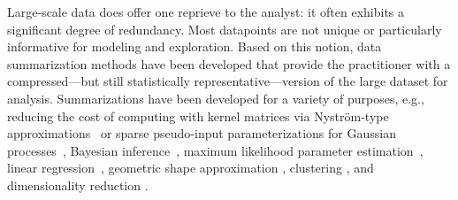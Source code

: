 \documentclass[a4paper,12pt,index,custombib]{Classes/PhDThesisPSnPDF}
\begin{document}
\begingroup
Large-scale data does offer one reprieve to the analyst: it often exhibits a significant degree of redundancy. Most datapoints are 
not unique or particularly informative for modeling and exploration. Based on this notion, data summarization methods have been developed  
that provide the practitioner with a compressed---but still statistically representative---version of the large dataset for analysis.
Summarizations have been developed for a variety of purposes, e.g., reducing the cost of computing with kernel matrices via Nystr{\"o}m-type approximations~\citep{drineas05,musco17,agrawal19} or sparse pseudo-input parameterizations for Gaussian processes~\citep{williams01,csato02,snelson05,titsias09},
Bayesian inference~\parencite{huggins16,huggins17,campbell18,campbell19jmlr}, maximum likelihood 
parameter estimation~\citep{dumouchel99,madigan02}, 
linear regression~\citep{zhou08,guhaniyogi15},
geometric shape approximation \citep{agarwal05},
clustering \citep{feldman11,lucic16,bachem15,braverman16}, and dimensionality reduction \citep{feldman16}.
\end{document}
